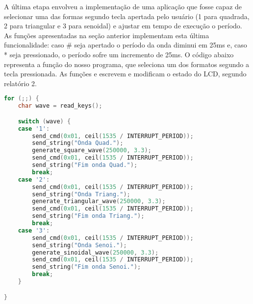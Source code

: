 A última etapa envolveu a implementação de uma aplicação que fosse capaz de
selecionar uma das formas segundo tecla apertada pelo usuário (1 para quadrada,
2 para triangular e 3 para senoidal) e ajustar em tempo de execução o período.
As funções apresentadas na seção anterior implementam esta última
funcionalidade: caso \# seja apertado o período da onda diminui em 25ms e, caso
* seja pressionado, o período sofre um incremento de 25ms. O código abaixo
representa a função do nosso programa, que seleciona um dos formatos segundo a
tecla pressionada. As funções  e  escrevem e
modificam o estado do LCD, segundo relatório 2.

\begin{lstlisting}[caption= Função \texttt{main}.,language=C, numbers=none] 
for (;;) {
	char wave = read_keys();

	switch (wave) {
	case '1':
		send_cmd(0x01, ceil(1535 / INTERRUPT_PERIOD));
		send_string("Onda Quad.");
		generate_square_wave(250000, 3.3);
		send_cmd(0x01, ceil(1535 / INTERRUPT_PERIOD));
		send_string("Fim onda Quad.");
		break;
	case '2':
		send_cmd(0x01, ceil(1535 / INTERRUPT_PERIOD));
		send_string("Onda Triang.");
		generate_triangular_wave(250000, 3.3);
		send_cmd(0x01, ceil(1535 / INTERRUPT_PERIOD));
		send_string("Fim onda Triang.");
		break;
	case '3':
		send_cmd(0x01, ceil(1535 / INTERRUPT_PERIOD));
		send_string("Onda Senoi.");
		generate_sinoidal_wave(250000, 3.3);
		send_cmd(0x01, ceil(1535 / INTERRUPT_PERIOD));
		send_string("Fim onda Senoi.");
		break;
	}

}
\end{lstlisting}

